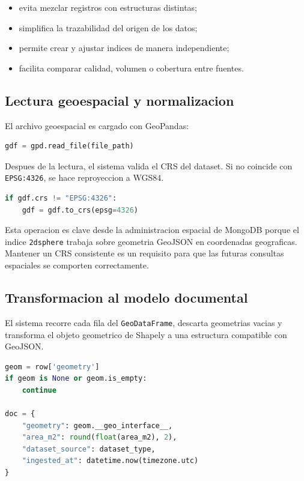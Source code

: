 \documentclass[12pt]{article}
\begin{document}
\begin{itemize}[leftmargin=*]
    \item evita mezclar registros con estructuras distintas;
    \item simplifica la trazabilidad del origen de los datos;
    \item permite crear y ajustar indices de manera independiente;
    \item facilita comparar calidad, volumen o cobertura entre fuentes.
\end{itemize}

\subsection{Lectura geoespacial y normalizacion}

El archivo geoespacial es cargado con GeoPandas:

\begin{lstlisting}[style=basicstyle,language=Python]
gdf = gpd.read_file(file_path)
\end{lstlisting}

Despues de la lectura, el sistema valida el CRS del dataset. Si no coincide con \texttt{EPSG:4326}, se hace reproyeccion a WGS84.

\begin{lstlisting}[style=basicstyle,language=Python]
if gdf.crs != "EPSG:4326":
    gdf = gdf.to_crs(epsg=4326)
\end{lstlisting}

Esta operacion es clave desde la administracion espacial de MongoDB porque el indice \texttt{2dsphere} trabaja sobre geometria GeoJSON en coordenadas geograficas. Mantener un CRS consistente es un requisito para que las futuras consultas espaciales se comporten correctamente.

\subsection{Transformacion al modelo documental}

El sistema recorre cada fila del \texttt{GeoDataFrame}, descarta geometrias vacias y transforma el objeto geometrico de Shapely a una estructura compatible con GeoJSON.

\begin{lstlisting}[style=basicstyle,language=Python]
geom = row['geometry']
if geom is None or geom.is_empty:
    continue

doc = {
    "geometry": geom.__geo_interface__,
    "area_m2": round(float(area_m2), 2),
    "dataset_source": dataset_type,
    "ingested_at": datetime.now(timezone.utc)
}
\end{lstlisting}
\end{document}
